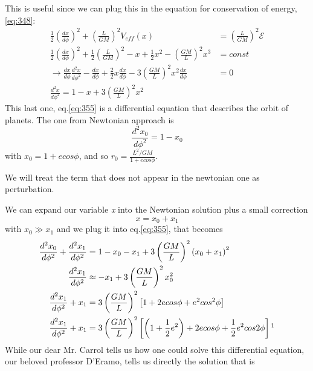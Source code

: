 This is useful since we can plug this in the equation for conservation of energy, \ref{eq:348}:
\begin{align}
	\frac{1}{2} \left( \frac{d x}{d \phi } \right)^{2} + \left( \frac{L}{GM} \right)^{2} V_{eff}\left( x \right) &= \left( \frac{L}{GM} \right)^{2} \mathcal{E} \nonumber\\ 
	\frac{1}{2} \left( \frac{d x}{d \phi } \right)^{2} + \frac{1}{2}\left( \frac{L}{GM} \right)^{2} - x + \frac{1}{2}x^{2} - \left( \frac{GM}{L} \right)^{2}x^{3} &= const \nonumber \\
	\to \frac{d x}{d \phi } \frac{d ^{2}x}{d \phi ^{2}} - \frac{d x}{d \phi } + \frac{2}{2}x \frac{d x}{d \phi } - 3 \left( \frac{GM}{L} \right)^{2}x^{2}\frac{d x}{d \phi } &=0\nonumber\\
	\frac{d ^{2}x}{d \phi ^{2}} = 1 - x + 3 \left( \frac{GM}{L} \right)^{2} x^{2} \label{eq:355}
\end{align}
This last one, eq.\ref{eq:355} is a differential equation that describes the orbit of planets. The one from Newtonian approach is 
\[
\frac{d^{2}x_{0} }{d \phi ^{2}} = 1 - x_{0}
\]
with $x_{0} = 1 + e cos \phi $, and so $r_{0} = \frac{L^{2}/GM}{1+e cos\phi }$.\par
We will treat the term that does not appear in the newtonian one as perturbation. \par
We can expand our variable \emph{x} into the Newtonian solution plus a small correction 
\begin{equation}\label{eq:xpansion}
x = x_{0} + x_{1} 
\end{equation}
with $x_{0} \gg x_{1}$
and we plug it into eq.\ref{eq:355}, that becomes
\begin{align}
	\frac{d ^{2}x_{0}}{d \phi ^{2}} + \frac{d ^{2}x_{1}}{d \phi ^{2}} &= 1 - x_{0} -x_{1} + 3\left( \frac{GM}{L} \right)^{2}\left( x_{0} +x_{1} \right)^{2} \nonumber \\
	\frac{d ^{2}x_{1}}{d \phi ^{2}} &\approx -x_{1} + 3 \left( \frac{GM}{L} \right)^{2}x_{0}^{2} \nonumber \\
	\frac{d ^{2}x_{1}}{d \phi^{2}} +x_{1} &= 3 \left( \frac{GM}{L} \right)^{2} \left[ 1 + 2ecos\phi + e^{2}cos^{2}\phi  \right] \nonumber \\
	\frac{d ^{2}x_{1}}{d \phi ^{2}} + x_{1} &= 3\left( \frac{GM}{L} \right)^{2} \left[ \left( 1 + \frac{1}{2}e^{2} \right) + 2ecos\phi + \frac{1}{2}e^{2} cos 2\phi  \right] \footnotemark
\end{align}
While our dear Mr. Carrol tells us how one could solve this differential equation, our beloved professor D'Eramo, tells us directly the solution that is
